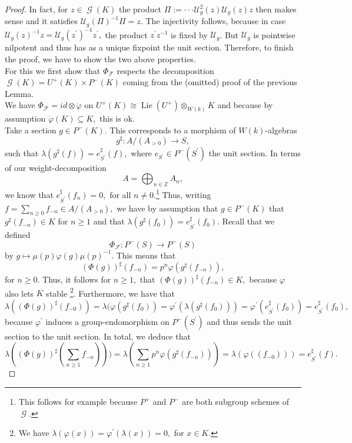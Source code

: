\documentclass[a4paper,10,5 pt]{amsart}
\theoremstyle{definition}
\DeclareMathOperator{\Lie}{Lie}
\DeclareMathOperator{\G}{\mathcal{G}}
\begin{document}
\begin{proof}
In fact, for $z\in\G(K)$ the product $\Pi:=\cdot\cdot\cdot\mathcal{U}^{2}_{g}(z)\mathcal{U}_{g}(z)z$ then makes sense and it satisfies $\mathcal{U}_{g}(\Pi)^{-1}\Pi=z.$ The injectivity follows, because in case $\mathcal{U}_{g}(z)^{-1}z=\mathcal{U}_{g}(z^{\prime})^{-1}z^{\prime},$ the product $z^{\prime}z^{-1}$ is fixed by $\mathcal{U}_{g}$. But $\mathcal{U}_{g}$ is pointwise nilpotent and thus has as a unique fixpoint the unit section. Therefore, to finish the proof, we have to show the two above properties.
\\
For this we first show that $\Phi_{\mathcal{F}}$ respects the decomposition $\G(K)=U^{+}(K)\times P^{-}(K)$ coming from the (omitted) proof of the previous Lemma.
\\
We have $\Phi_{\mathcal{F}}=id \otimes \dot{\varphi}$ on $U^{+}(K)\cong\Lie(U^{+})\otimes_{W(k)} K$ and because by assumption $\dot{\varphi}(K)\subseteq K,$ this is ok.
\\
Take a section $g\in P^{-}(K)$. This corresponds to a morphism of $W(k)$-algebras
$$g^{\sharp}\colon A/(A_{>0})\rightarrow S,$$ such that $\lambda(g^{\sharp}(f))=e^{\sharp}_{S^{\prime}}(f),$ where $e_{S^{\prime}}\in P^{-}(S^{\prime})$ the unit section. In terms of our weight-decomposition 
$$A=\bigoplus_{n\in \mathbb{Z}} A_{n},$$
we know that $e^{\sharp}_{S^{\prime}}(f_{n})=0,$ for all $n\neq 0.$\footnote{This follows for example because $P^{+}$ and $P^{-}$ are both subgroup schemes of $\G$.} Thus, writing $f=\sum_{n\geq 0} f_{-n}\in A/(A_{>0}),$ we have by assumption that $g\in P^{-}(K)$ that $g^{\sharp}(f_{-n})\in K$ for $n\geq 1$ and that $\lambda(g^{\sharp}(f_{0}))=e_{S^{\prime}}^{\sharp}(f_{0}).$ Recall that we defined
$$\Phi_{\mathcal{F}}\colon P^{-}(S)\rightarrow P^{-}(S)$$ by $g\mapsto \mu(p)\varphi(g)\mu(p)^{-1}$. This means that
$$(\Phi(g))^{\sharp}(f_{-n})=p^{n}\varphi(g^{\sharp}(f_{-n})),$$
for $n\geq 0.$ Thus, it follows for $n\geq 1,$ that $(\Phi(g))^{\sharp}(f_{-n})\in K,$ because $\varphi$ also lets $K$ stable \footnote{We have $\lambda(\varphi(x))=\varphi^{\prime}(\lambda(x))=0,$ for $x\in K.$}. Furthermore, we have that $$\lambda((\Phi(g))^{\sharp}(f_{-0}))=\lambda(\varphi(g^{\sharp}(f_{0}))=\varphi^{\prime}(\lambda(g^{\sharp}(f_{0})))=\varphi^{\prime}(e^{\sharp}_{S^{\prime}}(f_{0}))=e^{\sharp}_{S^{\prime}}(f_{0}),$$ because $\varphi^{\prime}$ induces a group-endomorphism on $P^{-}(S^{\prime})$ and thus sends the unit section to the unit section. In total, we deduce that
$$
\lambda((\Phi(g))^{\sharp}(\sum_{n\geq 1}f_{-n})))=\lambda(\sum_{n\geq 1} p^{n}\varphi(g^{\sharp}(f_{-n})))=\lambda(\varphi((f_{-0})))=e^{\sharp}_{S^{\prime}}(f).
$$
\end{proof}
\end{document}
